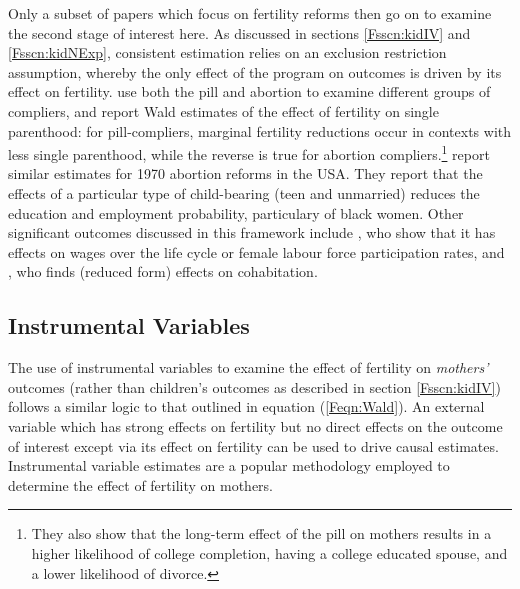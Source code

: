 \documentclass{article}
\begin{document}
\begin{spacing}{1.4}
Only a subset of papers which focus on fertility reforms then go on to examine
the second stage of interest here.  As discussed in sections \ref{Fsscn:kidIV} 
and \ref{Fsscn:kidNExp}, consistent estimation relies on an exclusion restriction
assumption, whereby the only effect of the program on outcomes is driven by
its effect on fertility. \citet{OltmansHungerman2012} use both the pill and
abortion to examine different groups of compliers, and report Wald estimates
of the effect of fertility on single parenthood: for pill-compliers, marginal
fertility reductions occur in contexts with less single parenthood, while the
reverse is true for abortion compliers.\footnote{They also show that the 
long-term effect of the pill on mothers results in a higher likelihood of college 
completion, having a college educated spouse, and a lower likelihood of 
divorce.} \citet{AngristEvans1996} report similar estimates for 1970 abortion 
reforms in the USA.  They report that the effects of a particular type of 
child-bearing (teen and unmarried) reduces the education and employment 
probability, particulary of black women.  Other significant outcomes discussed 
in this framework include \citet{Baileyetal2012,Bailey2006,Bailey2013}, who 
show that it has effects on wages over the life cycle or female labour force 
participation rates, and \citet{Christensen2012}, who finds (reduced form) 
effects on cohabitation.

\subsection{Instrumental Variables}
The use of instrumental variables to examine the effect of fertility on 
\emph{mothers'} outcomes (rather than children's outcomes as described
in section \ref{Fsscn:kidIV}) follows a similar logic to that outlined in
equation (\ref{Feqn:Wald}).  An external variable which has strong effects
on fertility but no direct effects on the outcome of interest except via its
effect on fertility can be used to drive causal estimates.  Instrumental 
variable estimates are a popular methodology employed to determine the 
effect of fertility on mothers.


\end{spacing}
\end{document}
